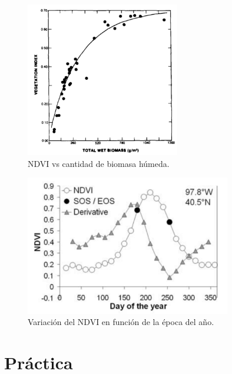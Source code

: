 \documentclass[handout]{beamer}
\begin{document}
\begin{frame}{\subsecname}
    \begin{figure}
    \centering
    \includegraphics[width=0.6\textwidth]{imagenes/avndvi.png}
    \caption{NDVI vs cantidad de biomasa húmeda.}
    \end{figure}
\end{frame}



\begin{frame}{\subsecname}
    \begin{figure}
    \centering
    \includegraphics[width=0.8\textwidth]{imagenes/ndvivst.png}
    \caption{Variación del NDVI en función de la época del año.}
    \end{figure}
\end{frame}


\section{Práctica}
\end{document}
